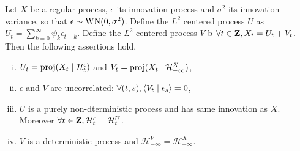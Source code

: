 	\begin{thm}
		Let $X$ be a regular process, $\epsilon$ its innovation process and $\sigma^2$ its innovation variance, so that $\epsilon \sim \operatorname{WN}(0,\sigma^2)$.
		Define the $L^2$ centered process $U$ as $U_t = \sum_{k = 0}^\infty \psi_k \epsilon_{t - k}$.
		Define the $L^2$ centered process $V$ b $\forall t \in \mathbf{Z}, X_t = U_t + V_t$.
		Then the following assertions hold,
		\begin{enumerate}[(i)]
			\item $U_t = \operatorname{proj}(X_t \mid \mathcal{H}_t^\epsilon)$ and $V_t = \operatorname{proj}(X_t \mid \mathcal{H}_{-\infty}^X)$,
			\item $\epsilon$ and $V$ are uncorrelated: $\forall (t,s), \left\langle V_t \mid \epsilon_s \right\rangle = 0$,
			\item $U$ is a purely non-dterministic process and has same innovation as $X$.
				Moreover $\forall t \in \mathbf{Z}, \mathcal{H}_t^\epsilon = \mathcal{H}_t^U$.
			\item $V$ is a deterministic process and $\mathcal{H}_{-\infty}^V = \mathcal{H}_{-\infty}^X$.
		\end{enumerate}
	\end{thm}
